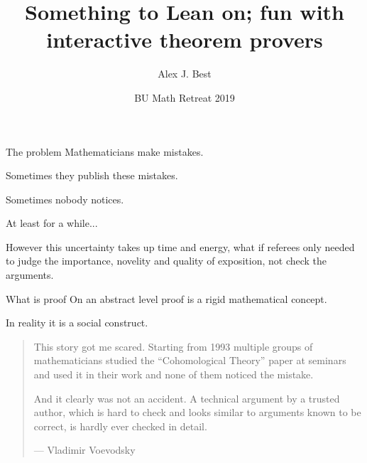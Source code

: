 \newcommand{\lb}{[}
\newcommand{\rb}{]}


\usepackage{listings}
\def\lstlanguagefiles{tex/lstlean.tex}

\lstset{language=lean}


\author{Alex J. Best}
\date{BU Math Retreat 2019}
\title{Something to Lean on; fun with interactive theorem provers}



\begin{frame}
  \titlepage

\end{frame}


\begin{frame}{The problem}
    Mathematicians make mistakes.

    \pause

    Sometimes they publish these mistakes.

    \pause

    Sometimes nobody notices.

    \pause

    At least for a while...

    \pause
    However this uncertainty takes up time and energy, what if referees only needed to judge the importance, novelity and quality of exposition, not check the arguments.

\end{frame}

\begin{frame}{What is proof}\pause
    On an abstract level proof is a rigid mathematical concept.\pause

    In reality it is a social construct.\pause

    \begin{quotation}
        This story got me scared. Starting from 1993 multiple groups of mathematicians
        studied the “Cohomological Theory” paper at seminars and used it in their work
        and none of them noticed the mistake.

        And it clearly was not an accident. A technical argument by a trusted author, which is hard to check and looks similar to arguments known to be correct, is hardly ever checked in detail.

        --- Vladimir Voevodsky
    \end{quotation}

\end{frame}

